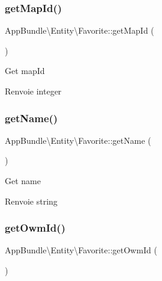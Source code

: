 \subsubsection{\texorpdfstring{get\+Map\+Id()}{getMapId()}}
{\footnotesize\ttfamily App\+Bundle\textbackslash{}\+Entity\textbackslash{}\+Favorite\+::get\+Map\+Id (\begin{DoxyParamCaption}{ }\end{DoxyParamCaption})}

Get map\+Id

\begin{DoxyReturn}{Renvoie}
integer 
\end{DoxyReturn}
\mbox{\label{classAppBundle_1_1Entity_1_1Favorite_a66cbf797b0af61339eb9ece8b36ecc1c}} 
\subsubsection{\texorpdfstring{get\+Name()}{getName()}}
{\footnotesize\ttfamily App\+Bundle\textbackslash{}\+Entity\textbackslash{}\+Favorite\+::get\+Name (\begin{DoxyParamCaption}{ }\end{DoxyParamCaption})}

Get name

\begin{DoxyReturn}{Renvoie}
string 
\end{DoxyReturn}
\mbox{\label{classAppBundle_1_1Entity_1_1Favorite_aca73f8e626c8cf7eb6cdf9a2843e15fe}} 
\subsubsection{\texorpdfstring{get\+Owm\+Id()}{getOwmId()}}
{\footnotesize\ttfamily App\+Bundle\textbackslash{}\+Entity\textbackslash{}\+Favorite\+::get\+Owm\+Id (\begin{DoxyParamCaption}{ }\end{DoxyParamCaption})}


